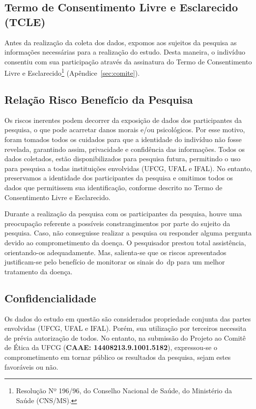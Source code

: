 \subsection{Termo de Consentimento Livre e Esclarecido (TCLE)}
Antes da realização da coleta dos dados, expomos aos sujeitos da pesquisa as informações necessárias para a realização do estudo. Desta maneira, o indivíduo consentiu com sua participação através da assinatura do Termo de Consentimento Livre e Esclarecido\footnote{Resolução Nº 196/96, do Conselho Nacional de Saúde, do Ministério da Saúde (CNS/MS).} (Apêndice~\ref{sec:comite}). 

\subsection{Relação Risco Benefício da Pesquisa}
Os riscos inerentes podem decorrer da exposição de dados dos participantes da pesquisa, o que pode acarretar danos morais e/ou psicológicos. Por esse motivo, foram tomados todos os cuidados para que a identidade do indivíduo não fosse revelada, garantindo assim, privacidade e confidência das informações. Todos os dados coletados, estão disponibilizados para pesquisa futura, permitindo o uso para pesquisa a todas instituições envolvidas (UFCG, UFAL e IFAL). No entanto, preservamos a identidade dos participantes da pesquisa e omitimos todos os dados que permitissem sua identificação, conforme descrito no Termo de Consentimento Livre e Esclarecido.

Durante a realização da pesquisa com os participantes da pesquisa, houve uma preocupação referente a possíveis constrangimentos por parte do sujeito da pesquisa. Caso, não conseguisse realizar a pesquisa ou responder alguma pergunta devido ao comprometimento da doença. O pesquisador prestou total assistência, orientando-os adequadamente. Mas, salienta-se que os riscos apresentados justificam-se pelo benefício de monitorar os sinais do~\ac{dp} para um melhor tratamento da doença.


\subsection{Confidencialidade}
Os dados do estudo em questão são considerados propriedade conjunta das partes envolvidas (UFCG, UFAL e IFAL). Porém, sua utilização por terceiros necessita de prévia autorização de todos. No entanto, na submissão do Projeto ao Comitê de Ética da UFCG (\textbf{CAAE: 14408213.9.1001.5182}), expressou-se o comprometimento em tornar público os resultados da pesquisa, sejam estes favoráveis ou não.





